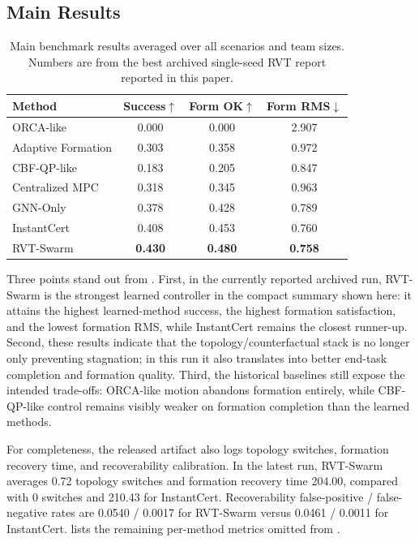 \documentclass[journal]{IEEEtran}
\begin{document}
\subsection{Main Results}
\label{sec:main_results}

\begin{table}[!t]
\centering
\caption{Main benchmark results averaged over all scenarios and team
sizes. Numbers are from the best archived single-seed RVT report
reported in this paper.}
\label{tab:main_results}
\scriptsize
\begin{tabular}{lccc}
\toprule
\textbf{Method}
& \textbf{Success}$\uparrow$
& \textbf{Form OK}$\uparrow$
& \textbf{Form RMS}$\downarrow$ \\
\midrule
ORCA-like          & 0.000 & 0.000 & 2.907 \\
Adaptive Formation & 0.303 & 0.358 & 0.972 \\
CBF-QP-like        & 0.183 & 0.205 & 0.847 \\
Centralized MPC    & 0.318 & 0.345 & 0.963 \\
GNN-Only           & 0.378 & 0.428 & 0.789 \\
InstantCert        & 0.408 & 0.453 & 0.760 \\
RVT-Swarm          & \textbf{0.430} & \textbf{0.480} & \textbf{0.758} \\
\bottomrule
\end{tabular}
\end{table}

Three points stand out from .
First, in the currently reported archived run, RVT-Swarm is the
strongest learned controller in the compact summary shown here: it
attains the highest learned-method success, the highest formation
satisfaction, and the lowest formation RMS, while InstantCert remains
the closest runner-up. Second, these results indicate that the
topology/counterfactual stack is no longer only preventing stagnation;
in this run it also translates into better end-task completion and
formation quality. Third, the historical baselines still expose the
intended trade-offs: ORCA-like motion abandons formation entirely, while
CBF-QP-like control remains visibly weaker on formation completion than
the learned methods.

For completeness, the released artifact also logs topology switches,
formation recovery time, and recoverability calibration. In the latest
run, RVT-Swarm averages 0.72 topology switches and formation recovery
time 204.00, compared with 0 switches and 210.43 for InstantCert.
Recoverability false-positive / false-negative rates are
0.0540 / 0.0017 for RVT-Swarm versus 0.0461 / 0.0011 for InstantCert.
 lists the remaining per-method metrics
omitted from .
\end{document}
